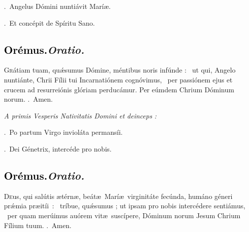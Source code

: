 \documentclass[12pt]{article} %
\newenvironment{rubric}{\vspace{1 mm}\color{benred8} \itshape \leftskip 0in \setlength{\parindent}{0.25in}}{\vspace{1 mm}}
\newenvironment{response}{\leftskip 0in \setlength{\parindent}{0in}}{\vspace{1 mm}}
\let\oldgresixstar\gresixstar
\renewcommand{\gresixstar}{\textcolor{benred8}{\oldgresixstar}}
\let\oldgredagger\gredagger
\renewcommand{\gredagger}{\textcolor{benred8}{\oldgredagger}}
\let\oldVbar\Vbar
\renewcommand{\Vbar}{\textcolor{benred8}{\oldVbar .}}
\let\oldRbar\Rbar
\renewcommand{\Rbar}{\textcolor{benred8}{\oldRbar .}}
\def\capitulumSpace{\hspace{20 mm}}
\begin{document}
\begin{response}
\Vbar\ Angelus D\'{o}mini nunti\'{a}vit Mar\'{i}\ae .

\Rbar\ Et conc\'{e}pit de Sp\'{i}ritu Sano.

\end{response}

\subsection*{\textcolor{black}{Or\'{e}mus.}\capitulumSpace \emph{Oratio.}}

\begin{response}\lettrine{G}{r}\'{a}tiam tuam, qu\'{\ae}sumus D\'{o}mine, m\'{e}ntibus noris inf\'{u}nde : \gredagger\ ut qui, Angelo nunti\'{a}nte, Chrii F\'{i}lii tui Incarnati\'{o}nem cogn\'{o}vimus, \gresixstar\ per passi\'{o}nem ejus et crucem ad resurrei\'{o}nis gl\'{o}riam perduc\'{a}mur. Per e\'{u}mdem Chrium D\'{o}minum norum. \Rbar\ Amen.

\end{response}

\begin{rubric}
A primis Vesperis Nativitatis Domini et deinceps :

\end{rubric}

\begin{response}
\Vbar\ Po partum Virgo inviol\'{a}ta permans\'{i}i.

\Rbar\ Dei G\'{e}netrix, interc\'{e}de pro nobis.

\end{response}

\subsection*{\textcolor{black}{Or\'{e}mus.}\capitulumSpace \emph{Oratio.}}

\begin{response}\lettrine{D}{e}us, qui sal\'{u}tis \ae t\'{e}rn\ae , be\'{a}t\ae\ Mar\'{i}\ae\ virginit\'{a}te fec\'{u}nda, hum\'{a}no g\'{e}neri pr\'{\ae}mia \mbox{pr\ae{}it\'{i}i : \gredagger} tr\'{i}bue, qu\'{\ae}sumus ; ut ipsam pro nobis interc\'{e}dere senti\'{a}mus, \gresixstar\ per quam mer\'{u}imus au\'{o}rem vit\ae\ susc\'{i}pere, D\'{o}minum norum Jesum Chrium F\'{i}lium tuum. \Rbar\ Amen.

\end{response}
\end{document}
